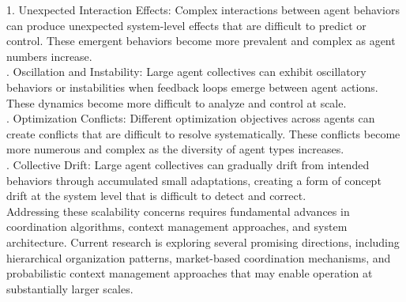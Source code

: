 1. Unexpected Interaction Effects: Complex interactions between agent behaviors can produce unexpected system-level effects that are difficult to predict or control. These emergent behaviors become more prevalent and complex as agent numbers increase.\\ . Oscillation and Instability: Large agent collectives can exhibit oscillatory behaviors or instabilities when feedback loops emerge between agent actions. These dynamics become more difficult to analyze and control at scale.\\ . Optimization Conflicts: Different optimization objectives across agents can create conflicts that are difficult to resolve systematically. These conflicts become more numerous and complex as the diversity of agent types increases.\\ . Collective Drift: Large agent collectives can gradually drift from intended behaviors through accumulated small adaptations, creating a form of concept drift at the system level that is difficult to detect and correct.\\ \newline
Addressing these scalability concerns requires fundamental advances in coordination algorithms, context management approaches, and system architecture. Current research is exploring several promising directions, including hierarchical organization patterns, market-based coordination mechanisms, and probabilistic context management approaches that may enable operation at substantially larger scales.\\
